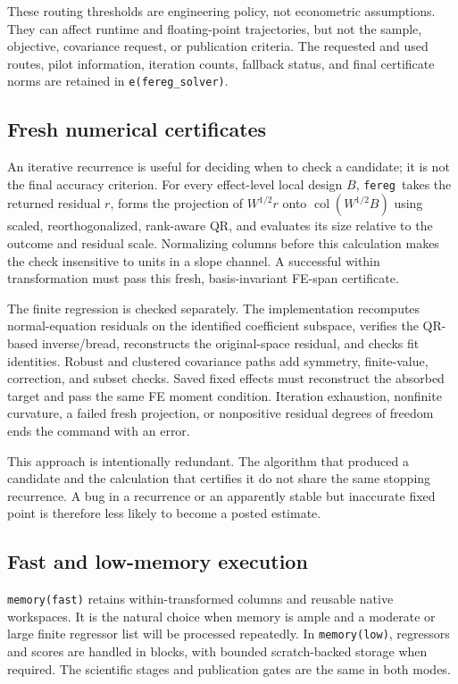 \documentclass[11pt]{article}
\newcommand{\fereg}{\texttt{fereg}}
\begin{document}
These routing thresholds are engineering policy, not econometric assumptions.
They can affect runtime and floating-point trajectories, but not the sample,
objective, covariance request, or publication criteria.  The requested and
used routes, pilot information, iteration counts, fallback status, and final
certificate norms are retained in \texttt{e(fereg\_solver)}.

\subsection{Fresh numerical certificates}
\label{sec:certificates}

An iterative recurrence is useful for deciding when to check a candidate; it
is not the final accuracy criterion.  For every effect-level local design
$B$, \fereg\ takes the returned residual $r$, forms the projection of
$W^{1/2}r$ onto $\operatorname{col}(W^{1/2}B)$ using scaled,
reorthogonalized, rank-aware QR, and evaluates its size relative to the
outcome and residual scale.  Normalizing columns before this calculation
makes the check insensitive to units in a slope channel.  A successful
within transformation must pass this fresh, basis-invariant FE-span
certificate.

The finite regression is checked separately.  The implementation recomputes
normal-equation residuals on the identified coefficient subspace, verifies
the QR-based inverse/bread, reconstructs the original-space residual, and
checks fit identities.  Robust and clustered covariance paths add symmetry,
finite-value, correction, and subset checks.  Saved fixed effects must
reconstruct the absorbed target and pass the same FE moment condition.
Iteration exhaustion, nonfinite curvature, a failed fresh projection, or
nonpositive residual degrees of freedom ends the command with an error.

This approach is intentionally redundant.  The algorithm that produced a
candidate and the calculation that certifies it do not share the same stopping
recurrence.  A bug in a recurrence or an apparently stable but inaccurate
fixed point is therefore less likely to become a posted estimate.

\subsection{Fast and low-memory execution}

\texttt{memory(fast)} retains within-transformed columns and reusable native
workspaces.  It is the natural choice when memory is ample and a moderate or
large finite regressor list will be processed repeatedly.  In
\texttt{memory(low)}, regressors and scores are handled in blocks, with
bounded scratch-backed storage when required.  The scientific stages and
publication gates are the same in both modes.
\end{document}
